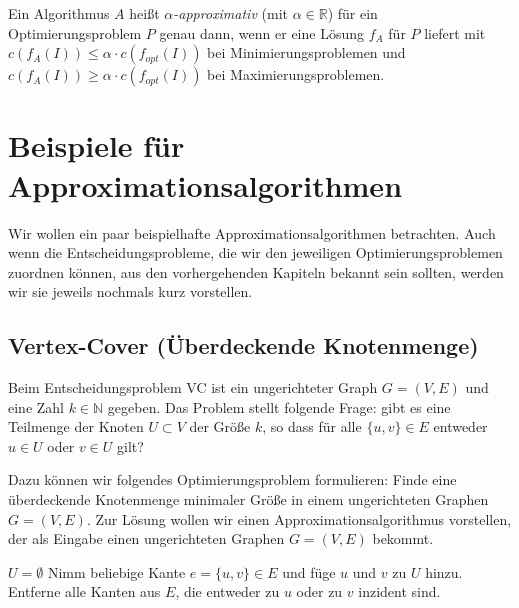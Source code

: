 \begin{Def}
  \hspace{\parindent}Ein Algorithmus $A$ heißt \textit{$\alpha$-approximativ} (mit $\alpha \in \mathbb{R}$) für ein Optimierungsproblem $P$ genau dann, wenn er eine Lösung $f_A$ für $P$ liefert mit $c(f_A(I)) \le \alpha \cdot c(f_{opt}(I))$ bei Minimierungsproblemen und
  $c(f_A(I)) \ge \alpha \cdot c(f_{opt}(I))$ bei Maximierungsproblemen.
\end{Def}

\section{Beispiele für Approximationsalgorithmen}
Wir wollen ein paar beispielhafte Approximationsalgorithmen betrachten. Auch wenn die Entscheidungsprobleme, die wir den jeweiligen Optimierungsproblemen zuordnen können, aus den vorhergehenden Kapiteln bekannt sein sollten, werden wir sie jeweils nochmals kurz vorstellen.

\subsection{Vertex-Cover (Überdeckende Knotenmenge)}
Beim Entscheidungsproblem \textsc{VC} ist ein ungerichteter Graph $G=(V,E)$ und eine Zahl $k \in \mathbb{N}$ gegeben. Das Problem stellt folgende Frage: gibt es eine Teilmenge der Knoten $U \subset V$ der Größe $k$, so dass für alle $\{u, v \} \in E$ entweder $u \in U$ oder $v \in U$ gilt?

Dazu können wir folgendes Optimierungsproblem formulieren: Finde eine überdeckende Knotenmenge minimaler Größe in einem ungerichteten Graphen $G=(V,E)$. Zur Lösung wollen wir einen Approximationsalgorithmus vorstellen, der als Eingabe einen ungerichteten Graphen $G=(V,E)$ bekommt.

\begin{Alg}
  \begin{algorithmic}[1]
    \State $U = \emptyset$
      \State Nimm beliebige Kante $e=\{u, v\} \in E$ und füge $u$ und $v$ zu $U$ hinzu.
      \State Entferne alle Kanten aus $E$, die entweder zu $u$ oder zu $v$ inzident sind.
    \EndWhile
  \end{algorithmic}
\end{Alg}



